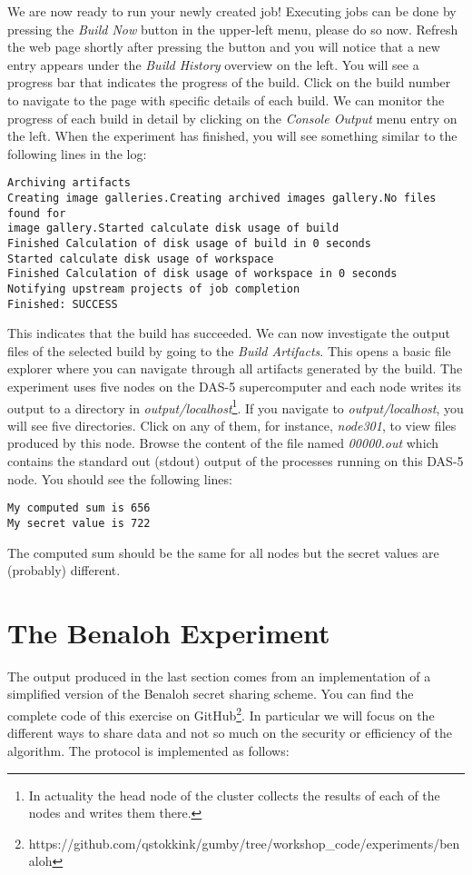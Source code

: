 \documentclass{article}
\begin{document}
We are now ready to run your newly created job!
Executing jobs can be done by pressing the \emph{Build Now} button in the upper-left menu, please do so now.
Refresh the web page shortly after pressing the button and you will notice that a new entry appears under the \emph{Build History} overview on the left.
You will see a progress bar that indicates the progress of the build.
Click on the build number to navigate to the page with specific details of each build.
We can monitor the progress of each build in detail by clicking on the \emph{Console Output} menu entry on the left.
When the experiment has finished, you will see something similar to the following lines in the log:

\begin{lstlisting}[frame=single]  % Start your code-block
Archiving artifacts
Creating image galleries.Creating archived images gallery.No files found for
image gallery.Started calculate disk usage of build
Finished Calculation of disk usage of build in 0 seconds
Started calculate disk usage of workspace
Finished Calculation of disk usage of workspace in 0 seconds
Notifying upstream projects of job completion
Finished: SUCCESS
\end{lstlisting}

This indicates that the build has succeeded.
We can now investigate the output files of the selected build by going to the \emph{Build Artifacts}.
This opens a basic file explorer where you can navigate through all artifacts generated by the build.
The experiment uses five nodes on the DAS-5 supercomputer and each node writes its output to a directory in \emph{output/localhost}\footnote{In actuality the head node of the cluster collects the results of each of the nodes and writes them there.}.
If you navigate to \emph{output/localhost}, you will see five directories.
Click on any of them, for instance, \emph{node301}, to view files produced by this node.
Browse the content of the file named \emph{00000.out} which contains the standard out (stdout) output of the processes running on this DAS-5 node.
You should see the following lines:

\begin{lstlisting}[frame=single]
My computed sum is 656
My secret value is 722
\end{lstlisting}

The computed sum should be the same for all nodes but the secret values are (probably) different.

\section{The Benaloh Experiment}
The output produced in the last section comes from an implementation of a simplified version of the Benaloh secret sharing scheme.
You can find the complete code of this exercise on GitHub\footnote{https://github.com/qstokkink/gumby/tree/workshop\_code/experiments/benaloh}.
In particular we will focus on the different ways to share data and not so much on the security or efficiency of the algorithm.
The protocol is implemented as follows:
\end{document}
